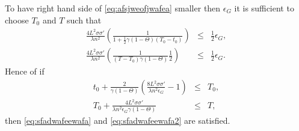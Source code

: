 \documentclass{article}
\newcommand{\calG}{G}
\newcommand{\0}{ {\bf 0}}
\theoremstyle{plain}
\theoremstyle{definition}
\begin{document}
To have right hand side of
\eqref{eq:afsjweofjwafea}
smaller then 
$\epsilon_\calG$
it is sufficient to choose
$T_0$ and $T$ such that
\begin{eqnarray}
\label{eq:sfadwafeewafa}
\frac{4L^2  \sigma   \sigma'}{\lambda n^2}
\left(
\frac{1}{ 1+ \frac12  \gamma (1-\Theta)  (T_0-t_0)}
\right)
&\leq & \frac12 \epsilon_\calG,
\\
\label{eq:sfadwafeewafa2}
\frac{4L^2  \sigma   \sigma'}{\lambda n^2}
\left(
\frac{1}{(T-T_0) \gamma (1-\Theta)} \frac{  1}{2 }
\right)
&\leq & \frac12 \epsilon_\calG.
\end{eqnarray}
Hence of 
if
\begin{eqnarray*}
t_0+
\frac{2}{ \gamma (1-\Theta) }
\left(
\frac
{8L^2  \sigma   \sigma'}
{\lambda n^2 \epsilon_\calG}
-1
\right)
&\leq & 
 T_0 
,
\\
T_0
+
\frac
{4L^2  \sigma   \sigma'}
{\lambda n^2 \epsilon_\calG
\gamma (1-\Theta)}
&\leq &  T,  
\end{eqnarray*}
then 
\eqref{eq:sfadwafeewafa}
and
\eqref{eq:sfadwafeewafa2}
are satisfied.
  
\end{document}
